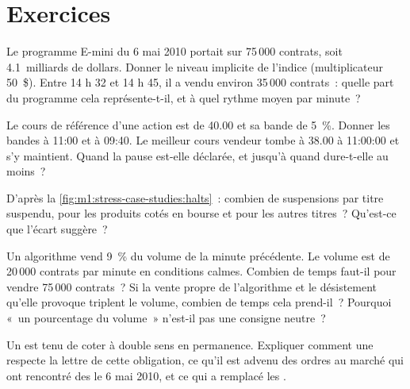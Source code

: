 \section{Exercices}

\begin{exercise}[$\star$]\label{exo:m1:stress-case-studies:1}
Le programme E-mini du 6 mai 2010 portait sur 75\,000 contrats, soit 4.1~milliards de dollars.
Donner le niveau implicite de l'indice (multiplicateur 50~\$). Entre 14 h 32 et 14 h 45, il a vendu
environ 35\,000 contrats~: quelle part du programme cela représente-t-il,
et à quel rythme moyen par minute~?
\end{exercise}

\begin{exercise}[$\star$]\label{exo:m1:stress-case-studies:2}
Le cours de référence d'une action est de 40.00 et sa bande de 5~\%. Donner les bandes à 11:00
et à 09:40. Le meilleur cours vendeur tombe à 38.00 à 11:00:00 et s'y maintient.
Quand la pause est-elle déclarée, et jusqu'à quand dure-t-elle au moins~?
\end{exercise}

\begin{exercise}[$\star$]\label{exo:m1:stress-case-studies:3}
D'après la \cref{fig:m1:stress-case-studies:halts}~: combien de suspensions par titre suspendu,
pour les produits cotés en bourse et pour les autres titres~?
Qu'est-ce que l'écart suggère~?
\end{exercise}

\begin{exercise}[$\star\star$]\label{exo:m1:stress-case-studies:4}
Un algorithme vend 9~\% du volume de la minute précédente. Le volume est de 20\,000
contrats par minute en conditions calmes. Combien de temps faut-il pour vendre 75\,000
contrats~? Si la vente propre de l'algorithme et le désistement qu'elle provoque triplent
le volume, combien de temps cela prend-il~? Pourquoi «~un pourcentage du volume~» n'est-il pas une
consigne neutre~?
\end{exercise}

\begin{exercise}[$\star\star$]\label{exo:m1:stress-case-studies:5}
Un  est tenu de coter à double sens en permanence. Expliquer comment une
 respecte la lettre de cette obligation, ce qu'il est advenu des ordres au
marché qui ont rencontré des  le 6 mai 2010, et ce qui a remplacé les .
\end{exercise}

